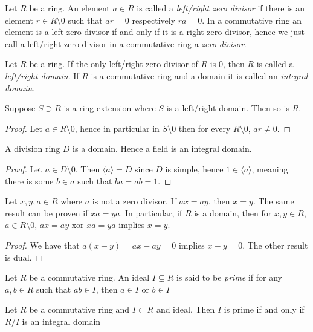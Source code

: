 \begin{definition}
    Let $R$ be a ring. An element $a\in R$ is called a \textit{left/right zero divisor} if there is an element $r\in R\setminus 0$ such that $ar = 0$ respectively $ra = 0$. In a commutative ring an element is a left zero divisor if and only if it is a right zero divisor, hence we just call a left/right zero divisor in a commutative ring a \textit{zero divisor}.  
\end{definition}
\begin{definition}
    Let $R$ be a ring. If the only left/right zero divisor of $R$ is $0$, then $R$ is called a \textit{left/right domain}. If $R$ is a commutative ring and a domain it is called an \textit{integral domain}. 
\end{definition}
\begin{lemma}\label{SubringOfIDIsID}
    Suppose $S\supset R$ is a ring extension where $S$ is a left/right domain. Then so is $R$.
\end{lemma}
\begin{proof}
    Let $a\in R\setminus 0$, hence in particular in $S\setminus 0$ then for every $R\setminus 0$, $ar\neq0$. 
\end{proof}
\begin{proposition}
    A division ring $D$ is a domain. Hence a field is an integral domain.
\end{proposition}
\begin{proof}
    Let $a\in D\setminus 0$. Then $\langle a \rangle = D$ since $D$ is simple, hence $1\in \langle a\rangle$, meaning there is some $b\in a$ such that $ba = ab = 1$. 
\end{proof}
\begin{lemma}\label{WeCanDivideByElementsWhichAreNotZeroDivisors}
    Let $x,y, a\in R$ where $a$ is not a zero divisor. If $ax = ay$, then $x=y$. The same result can be proven if $xa = ya$. In particular, if $R$ is a domain, then for $x,y\in R$, $a\in R\setminus 0$, $ax=ay$ xor $xa=ya$ implies $x=y$. 
\end{lemma}
\begin{proof}
    We have that $a(x-y)=ax-ay = 0$ implies $x-y=0$. The other result is dual. 
\end{proof}
\begin{definition}
    Let $R$ be a commutative ring. An ideal $I\subsetneq R$ is said to be \textit{prime} if for any $a,b \in R$ such that $ab\in I$, then $a \in I$ or $b\in I$   
\end{definition}
\begin{lemma}\label{PrimeIdealIffQuotientRingID}
    Let $R$ be a commutative ring and $I\subset R$ and ideal. Then $I$ is prime if and only if $R/I$ is an integral domain
\end{lemma}
